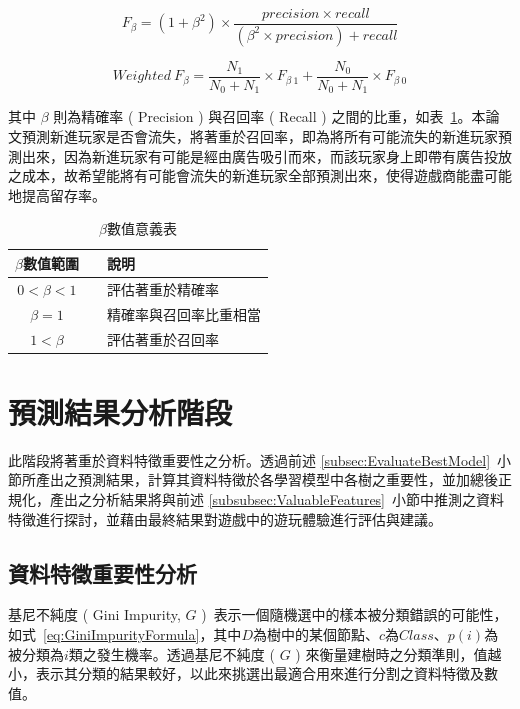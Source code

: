 \begin{equation}
  \label{eq:FbetaFormula}
  F_{\beta} = (1 + \beta^2) \times \frac{precision \times recall}{(\beta^2 \times precision) + recall}
\end{equation}

\begin{equation}
  \label{eq:WeightedFbetaFormula}
  Weighted\ F_{\beta} = \frac{N_1}{N_0 + N_1} \times F_{\beta\ 1} + \frac{N_0}{N_0 + N_1} \times F_{\beta\ 0}
\end{equation}

其中 $\beta$ 則為精確率 ( Precision ) 與召回率 ( Recall ) 之間的比重，如表~\ref{tab:beta}。本論文預測新進玩家是否會流失，將著重於召回率，即為將所有可能流失的新進玩家預測出來，因為新進玩家有可能是經由廣告吸引而來，而該玩家身上即帶有廣告投放之成本，故希望能將有可能會流失的新進玩家全部預測出來，使得遊戲商能盡可能地提高留存率。

\begin{table}[!htb]
	\centering
	\begin{tabular}{ccl}
		\hline \hline
		$\beta$數值範圍 && 說明 \\
    \hline \hline
    $0 < \beta < 1$ && 評估著重於精確率 \\
    \hline
    $\beta = 1$ && 精確率與召回率比重相當 \\
    \hline
    $1 < \beta$ && 評估著重於召回率 \\
    \hline \hline
		\end{tabular}
	\caption[$\beta$數值意義表]{$\beta$數值意義表}
	\label{tab:beta}
\end{table}

\section{預測結果分析階段}
\label{sec:PredictionResultAnalysis}

此階段將著重於資料特徵重要性之分析。透過前述 \ref{subsec:EvaluateBestModel}~小節所產出之預測結果，計算其資料特徵於各學習模型中各樹之重要性，並加總後正規化，產出之分析結果將與前述 \ref{subsubsec:ValuableFeatures}~小節中推測之資料特徵進行探討，並藉由最終結果對遊戲中的遊玩體驗進行評估與建議。

\subsection{資料特徵重要性分析}
\label{subsec:FeatureImportanceAnalysis}

基尼不純度 ( Gini Impurity, $G$ )~\cite{wiki:DecisionTreeLearning}表示一個隨機選中的樣本被分類錯誤的可能性，如式~\ref{eq:GiniImpurityFormula}，其中$D$為樹中的某個節點、$c$為$Class$、$p(i)$為被分類為$i$類之發生機率。透過基尼不純度 ( $G$ ) 來衡量建樹時之分類準則，值越小，表示其分類的結果較好，以此來挑選出最適合用來進行分割之資料特徵及數值。

